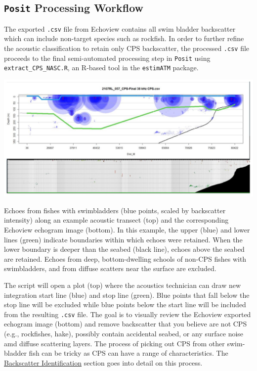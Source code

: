 \documentclass[
  letterpaper,
  oneside,
  open=any]{scrbook}
\begin{document}
\subsection{\texorpdfstring{\texttt{Posit} Processing
Workflow}{Posit Processing Workflow}}\label{posit-processing-workflow}

The exported \texttt{.csv} file from Echoview contains all swim bladder
backscatter which can include non-target species such as rockfish. In
order to further refine the acoustic classification to retain only CPS
backscatter, the processed \texttt{.csv} file proceeds to the final
semi-automated processing step in \texttt{Posit} using
\texttt{extract\_CPS\_NASC.R}, an R-based tool in the \texttt{estimATM}
package.

\includegraphics{content/images/nascr_processing.JPG}

Echoes from fishes with swimbladders (blue points, scaled by backscatter
intensity) along an example acoustic transect (top) and the
corresponding Echoview echogram image (bottom). In this example, the
upper (blue) and lower lines (green) indicate boundaries within which
echoes were retained. When the lower boundary is deeper than the seabed
(black line), echoes above the seabed are retained. Echoes from deep,
bottom-dwelling schools of non-CPS fishes with swimbladders, and from
diffuse scatters near the surface are excluded.

The script will open a plot (top) where the acoustics technician can
draw new integration start line (blue) and stop line (green). Blue
points that fall below the stop line will be excluded while blue points
below the start line will be included from the resulting \texttt{.csv}
file. The goal is to visually review the Echoview exported echogram
image (bottom) and remove backscatter that you believe are not CPS
(e.g., rockfishes, hake), possibly contain accidental seabed, or any
surface noise amd diffuse scattering layers. The process of picking out
CPS from other swim-bladder fish can be tricky as CPS can have a range
of characteristics. The
\href{https://nmfs-swfsc-ast.github.io/echo-class/content/identification.html}{Backscatter
Identification} section goes into detail on this process.
\end{document}
